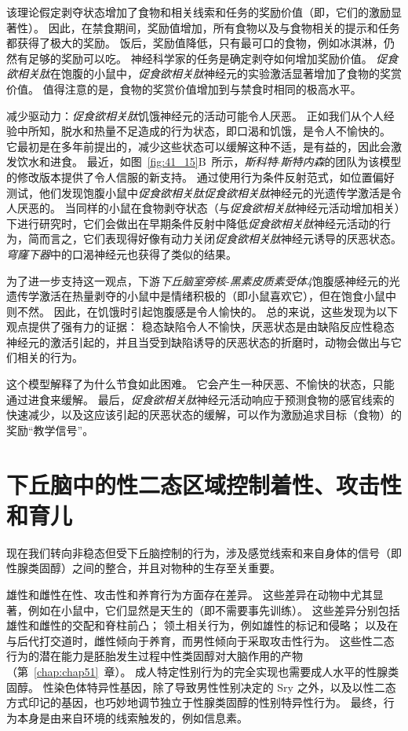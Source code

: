 该理论假定剥夺状态增加了食物和相关线索和任务的奖励价值（即，它们的激励显著性）。
因此，在禁食期间，奖励值增加，所有食物以及与食物相关的提示和任务都获得了极大的奖励。
饭后，奖励值降低，只有最可口的食物，例如冰淇淋，仍然有足够的奖励可以吃。
神经科学家的任务是确定剥夺如何增加奖励价值。
\textit{促食欲相关肽}在饱腹的小鼠中，\textit{促食欲相关肽}神经元的实验激活显著增加了食物的奖赏价值。
值得注意的是，食物的奖赏价值增加到与禁食时相同的极高水平。


减少驱动力：\textit{促食欲相关肽}饥饿神经元的活动可能令人厌恶。
正如我们从个人经验中所知，脱水和热量不足造成的行为状态，即口渴和饥饿，是令人不愉快的。
它最初是在多年前提出的，减少这些状态可以缓解这种不适，是有益的，因此会激发饮水和进食。
最近，如图~\ref{fig:41_15}B~所示，\textit{斯科特$\cdot$斯特内森}的团队为该模型的修改版本提供了令人信服的新支持。
通过使用行为条件反射范式，如位置偏好测试，他们发现饱腹小鼠中\textit{促食欲相关肽}\textit{促食欲相关肽}神经元的光遗传学激活是令人厌恶的。
当同样的小鼠在食物剥夺状态（与\textit{促食欲相关肽}神经元活动增加相关）下进行研究时，它们会做出在早期条件反射中降低\textit{促食欲相关肽}神经元活动的行为，简而言之，它们表现得好像有动力关闭\textit{促食欲相关肽}神经元诱导的厌恶状态。
\textit{穹窿下器}中的口渴神经元也获得了类似的结果。


为了进一步支持这一观点，下游\textit{下丘脑室旁核}-\textit{黑素皮质素受体4}饱腹感神经元的光遗传学激活在热量剥夺的小鼠中是情绪积极的（即小鼠喜欢它），但在饱食小鼠中则不然。
因此，在饥饿时引起饱腹感是令人愉快的。
总的来说，这些发现为以下观点提供了强有力的证据：
稳态缺陷令人不愉快，厌恶状态是由缺陷反应性稳态神经元的激活引起的，并且当受到缺陷诱导的厌恶状态的折磨时，动物会做出与它们相关的行为。


这个模型解释了为什么节食如此困难。
它会产生一种厌恶、不愉快的状态，只能通过进食来缓解。
最后，\textit{促食欲相关肽}神经元活动响应于预测食物的感官线索的快速减少，以及这应该引起的厌恶状态的缓解，可以作为激励追求目标（食物）的奖励“教学信号”。



\section{下丘脑中的性二态区域控制着性、攻击性和育儿}

现在我们转向非稳态但受下丘脑控制的行为，涉及感觉线索和来自身体的信号（即性腺类固醇）之间的整合，并且对物种的生存至关重要。


雄性和雌性在性、攻击性和养育行为方面存在差异。
这些差异在动物中尤其显著，例如在小鼠中，它们显然是天生的（即不需要事先训练）。
这些差异分别包括雄性和雌性的交配和脊柱前凸；
领土相关行为，例如雄性的标记和侵略；
以及在与后代打交道时，雌性倾向于养育，而男性倾向于采取攻击性行为。
这些性二态行为的潜在能力是胚胎发生过程中性类固醇对大脑作用的产物（第~\ref{chap:chap51}~章）。
成人特定性别行为的完全实现也需要成人水平的性腺类固醇。
性染色体特异性基因，除了导致男性性别决定的 Sry 之外，以及以性二态方式印记的基因，也巧妙地调节独立于性腺类固醇的性别特异性行为。
最终，行为本身是由来自环境的线索触发的，例如信息素。


